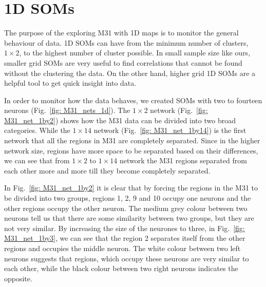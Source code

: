 \section{1D SOMs}
    \label{Sec: 1d_cluster}
    The purpose of the exploring M31 with 1D maps is to monitor the general behaviour of data. 
    1D SOMs can have from the minimum number of clusters, $1\times2$, to the highest number of cluster possible.
    In small sample size like ours, smaller grid SOMs are very useful to find correlations that cannot be found without the clustering the data.
    On the other hand, higher grid 1D SOMs are a helpful tool to get quick insight into data.

        In order to monitor how the data behaves, we created SOMs with two to fourteen neurons (Fig.~\ref{fig: M31_nets_1d}).
        The $1\times2$ network (Fig.~\ref{fig: M31_net_1by2}) shows how the M31 data can be divided into two broad categories.
        While the $1\times14$ network (Fig.~\ref{fig: M31_net_1by14}) is the first network that all the regions in M31 are completely separated.
        Since in the higher network size, regions have more space to be separated based on their differences, we can see that from $1\times2$ to $1\times14$ network the M31 regions separated from each other more and more till they become completely separated. 
        
        In Fig.~\ref{fig: M31_net_1by2} it is clear that by forcing the regions in the M31 to be divided into two groups, regions 1, 2, 9 and 10 occupy one neurons and the other regions occupy the other neuron.
        The medium grey colour between two neurons tell us that there are some similarity between two groups, but they are not very similar. 
        By increasing the size of the neurones to three, in Fig.~\ref{fig: M31_net_1by3}, we can see that the region 2 separates itself from the other regions and occupies the middle neuron.
        The white colour between two left neurons suggests that regions, which occupy these neurons are very similar to each other, while the black colour between two right neurons indicates the opposite.
        
